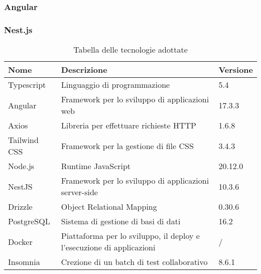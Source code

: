 \subsubsection{Angular}

\subsubsection{Nest.js}

\begin{table}[H]
	\centering
	\begin{tabularx}{\textwidth}{lXl}
		\hline
		\textbf{Nome} & \textbf{Descrizione}                                                  & \textbf{Versione} \\
		\hline
		Typescript    & Linguaggio di programmazione                                          & 5.4               \\
		\hline
		Angular       & Framework per lo sviluppo di applicazioni web                         & 17.3.3            \\
		\hline
		Axios         & Libreria per effettuare richieste HTTP                                & 1.6.8             \\
		\hline
		Tailwind CSS  & Framework per la gestione di file CSS                                 & 3.4.3             \\
		\hline
		Node.js       & Runtime JavaScript                                                    & 20.12.0           \\
		\hline
		NestJS        & Framework per lo sviluppo di applicazioni server-side                 & 10.3.6            \\
		\hline
		Drizzle       & Object Relational Mapping                                             & 0.30.6            \\
		\hline
		PostgreSQL    & Sistema di gestione di basi di dati                                   & 16.2              \\
		\hline
		Docker        & Piattaforma per lo sviluppo, il deploy e l'esecuzione di applicazioni & /                 \\
		\hline
		Insomnia      & Crezione di un batch di test collaborativo                            & 8.6.1             \\
		\hline
	\end{tabularx}
	\caption{Tabella delle tecnologie adottate}
\end{table}
